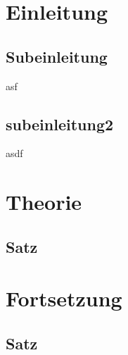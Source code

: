 \documentclass[10pt,twoside, a4paper]{article}
\begin{document}
\section{Einleitung}
\blindtext
\subsection{Subeinleitung} %
\label{sub:subeinleitung}
asf
\newpage
\subsection{subeinleitung2} %
\label{sub:subeinleitung2}
asdf
\newpage
\section{Theorie}
\blindtext
\subsection{Satz}
\blindtext

\blindtext

\blindtext

\blindtext

\section{Fortsetzung}
\blindtext
\subsection{Satz}
\blindtext

\blindtext

\blindtext

\blindtext
\end{document}
